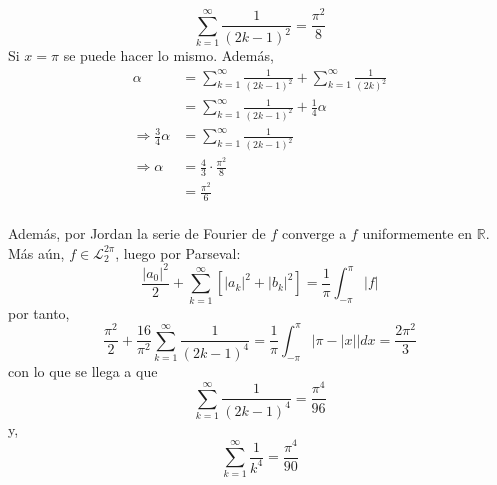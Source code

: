 \documentclass[12pt]{report}
\theoremstyle{largebreak}
\newcommand\abs[1]{\ensuremath{\left|#1\right|}}
\begin{document}
\begin{exa}
\begin{equation*}
            \sum_{ k=1}^\infty\frac{1}{(2k-1)^2}=\frac{\pi^2}{8}
        \end{equation*}
        Si $x=\pi$ se puede hacer lo mismo. Además,
        \begin{equation*}
            \begin{split}
                \alpha&=\sum_{ k=1}^\infty\frac{1}{(2k-1)^2}+\sum_{ k=1}^\infty\frac{1}{(2k)^2}\\
                &=\sum_{ k=1}^\infty\frac{1}{(2k-1)^2}+\frac{1}{4}\alpha\\
                \Rightarrow \frac{3}{4}\alpha&=\sum_{ k=1}^\infty\frac{1}{(2k-1)^2}\\
                \Rightarrow \alpha&=\frac{4}{3}\cdot\frac{\pi^2}{8}\\
                &=\frac{\pi^2}{6}\\
            \end{split}
        \end{equation*}

        Además, por Jordan la serie de Fourier de $f$ converge a $f$ uniformemente en $\mathbb{R}$. Más aún, $f\in\mathcal{L}_2^{2\pi}$, luego por Parseval:
        \begin{equation*}
            \frac{\abs{a_0}^2}{2}+\sum_{ k=1}^\infty\left[\abs{a_k}^2+\abs{b_k}^2 \right]=\frac{1}{\pi}\int_{-\pi}^{\pi}\abs{f}
        \end{equation*}
        por tanto,
        \begin{equation*}
            \frac{\pi^2}{2}+\frac{16}{\pi^2}\sum_{ k=1}^\infty\frac{1}{(2k-1)^4}=\frac{1}{\pi}\int_{-\pi}^{\pi}\abs{\pi-\abs{x}}dx=\frac{2\pi^2}{3}
        \end{equation*}
        con lo que se llega a que
        \begin{equation*}
            \sum_{ k=1}^\infty\frac{1}{(2k-1)^4}=\frac{\pi^4}{96}
        \end{equation*}
        y,
        \begin{equation*}
            \sum_{ k=1}^\infty\frac{1}{k^4}=\frac{\pi^4}{90}
        \end{equation*}
    \end{exa}

    
\end{document}
